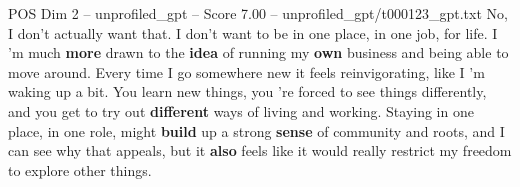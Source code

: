 \begin{textsample}{POS Dim 2 – unprofiled\_gpt – Score 7.00 – unprofiled\_gpt/t000123\_gpt.txt}  \label{ex:f2_pos_030}
No, I don't actually want that.
I don't want to be in one place, in one job, for life.
I ’m much \textbf{more} drawn to the \textbf{idea} of running my \textbf{own} business and being able to move around.
Every time I go somewhere new it feels reinvigorating, like I ’m waking up a bit.
You learn new things, you ’re forced to see things differently, and you get to try out \textbf{different} ways of living and working.
Staying in one place, in one role, might \textbf{build} up a strong \textbf{sense} of community and roots, and I can see why that appeals, but it \textbf{also} feels like it would really restrict my freedom to explore other things.

\end{textsample}
